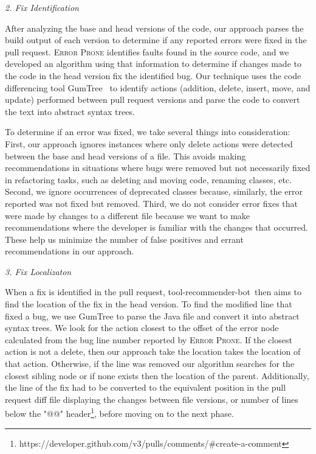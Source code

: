 \documentclass[conference]{IEEEtran}
\newcommand{\tool}{tool-recommender-bot}
\newcommand{\pseudosubsection}[1]{\vspace{2mm} {\it #1}}
\begin{document}
\pseudosubsection{2. Fix Identification}

After analyzing the base and head versions of the code, our approach parses the build output of each version to determine if any reported errors were fixed in the pull request. \textsc{Error Prone} identifies faults found in the source code, and we developed an algorithm using that information to determine if changes made to the code in the head version fix the identified bug. Our technique uses the code differencing tool GumTree~\cite{GumTree} to identify actions (addition, delete, insert, move, and update) performed between pull request versions and parse the code to convert the text into abstract syntax trees. 

To determine if an error was fixed, we take several things into consideration: First, our approach ignores instances where only delete actions were detected between the base and head versions of a file. This avoids making recommendations in situations where bugs were removed but not necessarily fixed in refactoring tasks, such as deleting and moving code, renaming classes, etc. Second, we ignore occurrences of deprecated classes because, similarly, the error reported was not fixed but removed. Third, we do not consider error fixes that were made by changes to a different file because we want to make recommendations where the developer is familiar with the changes that occurred. These help us minimize the number of false positives and errant recommendations in our approach.

\pseudosubsection{3. Fix Localizaton}

When a fix is identified in the pull request, \tool~then aims to find the location of the fix in the head version. To find the modified line that fixed a bug, we use GumTree to parse the Java file and convert it into abstract syntax trees. We look for the action closest to the offset of the error node calculated from the bug line number reported by \textsc{Error Prone}. If the closest action is not a delete, then our approach take the location takes the location of that action. Otherwise, if the line was removed our algorithm searches for the closest sibling node or if none exists then the location of the parent. Additionally, the line of the fix had to be converted to the equivalent position in the pull request diff file displaying the changes between file versions, or number of lines below the "@@" header\footnote{https://developer.github.com/v3/pulls/comments/\#create-a-comment}, before moving on to the next phase.
\end{document}
